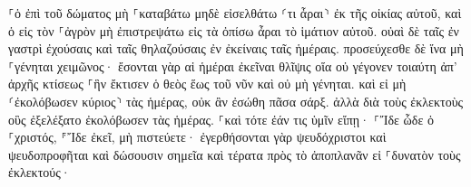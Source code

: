 \documentclass{openreader}
\begin{document}
⸀ὁ ἐπὶ τοῦ δώματος μὴ ⸀καταβάτω μηδὲ εἰσελθάτω ⸂τι ἆραι⸃ ἐκ τῆς οἰκίας αὐτοῦ, 
καὶ ὁ εἰς τὸν ⸀ἀγρὸν μὴ ἐπιστρεψάτω εἰς τὰ ὀπίσω ἆραι τὸ ἱμάτιον αὐτοῦ. 
οὐαὶ δὲ ταῖς ἐν γαστρὶ ἐχούσαις καὶ ταῖς θηλαζούσαις ἐν ἐκείναις ταῖς ἡμέραις. 
προσεύχεσθε δὲ ἵνα μὴ ⸀γένηται χειμῶνος· 
ἔσονται γὰρ αἱ ἡμέραι ἐκεῖναι θλῖψις οἵα οὐ γέγονεν τοιαύτη ἀπ’ ἀρχῆς κτίσεως ⸀ἣν ἔκτισεν ὁ θεὸς ἕως τοῦ νῦν καὶ οὐ μὴ γένηται. 
καὶ εἰ μὴ ⸂ἐκολόβωσεν κύριος⸃ τὰς ἡμέρας, οὐκ ἂν ἐσώθη πᾶσα σάρξ. ἀλλὰ διὰ τοὺς ἐκλεκτοὺς οὓς ἐξελέξατο ἐκολόβωσεν τὰς ἡμέρας. 
⸀καὶ τότε ἐάν τις ὑμῖν εἴπῃ· ⸀Ἴδε ὧδε ὁ ⸀χριστός, ⸁Ἴδε ἐκεῖ, μὴ πιστεύετε· 
ἐγερθήσονται γὰρ ψευδόχριστοι καὶ ψευδοπροφῆται καὶ δώσουσιν σημεῖα καὶ τέρατα πρὸς τὸ ἀποπλανᾶν εἰ ⸀δυνατὸν τοὺς ἐκλεκτούς· 
\end{document}
